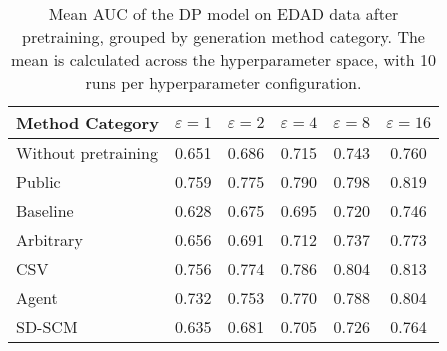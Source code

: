 \begin{table}[h!]
    \centering
    \caption{Mean AUC of the DP model on EDAD data after pretraining, grouped by generation method category. The mean is calculated across the hyperparameter space, with 10 runs per hyperparameter configuration.}
    \label{tab:epsilon_comparison}
    \begin{tabular}{lccccc}
    \toprule
    Method Category & $\varepsilon=1$ & $\varepsilon=2$ & $\varepsilon=4$ & $\varepsilon=8$ & $\varepsilon=16$ \\
    \midrule
    Without pretraining & 0.651 & 0.686 & 0.715 & 0.743 & 0.760 \\
    \arrayrulecolor{black!50!}\midrule
    Public & \cellcolor{gold!30}0.759 & \cellcolor{gold!30}0.775 & \cellcolor{gold!30}0.790 & \cellcolor{silver!30}0.798 & \cellcolor{gold!30}0.819 \\
    \arrayrulecolor{black!50!}\midrule
    Baseline & 0.628 & 0.675 & 0.695 & 0.720 & 0.746 \\
    \arrayrulecolor{black!50!}\midrule
    Arbitrary & 0.656 & 0.691 & 0.712 & 0.737 & 0.773 \\
    \arrayrulecolor{black!50!}\midrule
    CSV & \cellcolor{silver!30}0.756 & \cellcolor{silver!30}0.774 & \cellcolor{silver!30}0.786 & \cellcolor{gold!30}0.804 & \cellcolor{silver!30}0.813 \\
    Agent & \cellcolor{bronze!30}0.732 & \cellcolor{bronze!30}0.753 & \cellcolor{bronze!30}0.770 & \cellcolor{bronze!30}0.788 & \cellcolor{bronze!30}0.804 \\
    SD-SCM & 0.635 & 0.681 & 0.705 & 0.726 & 0.764 \\
    \bottomrule
    \end{tabular}
\end{table}